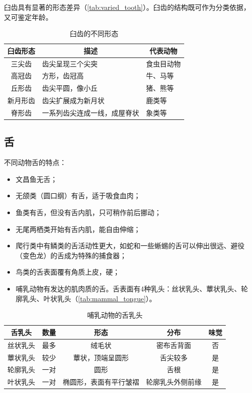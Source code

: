 臼齿具有显著的形态差异（\autoref{tab:varied_tooth}）。臼齿的结构既可作为分类依据，又可鉴定年龄。

\begin{table}[h]
	\centering
	\begin{tabularx}{\textwidth}{|c|X|X|}
		\hline
		臼齿形态 & \multicolumn{1}{c|}{描述} & \multicolumn{1}{c|}{代表动物} \\ \hline
		三尖齿 & 齿尖呈现三个尖突 & 食虫目动物 \\ \hline
		高冠齿 & 方形，齿冠高 & 牛、马等 \\ \hline
		丘形齿 & 齿尖平圆，像小丘 & 猪、熊等 \\ \hline
		新月形齿 & 齿尖扩展成为新月状 & 鹿类等 \\ \hline
		脊形齿 & 一系列齿尖连成一线，成屋脊状 & 象类等 \\ \hline
	\end{tabularx}
	\caption{臼齿的不同形态}
	\label{tab:varied_tooth}
\end{table}


\subsection{舌}

不同动物舌的特点：

\begin{itemize}
	\item 文昌鱼无舌；
	\item 无颌类（圆口纲）有舌，适于吸食血肉；
	\item 鱼类有舌，但没有舌内肌，只可稍作前后挪动；
	\item 无尾两栖类开始有舌内肌，能自由伸缩；
	\item 爬行类中有鳞类的舌活动性更大，如蛇和一些蜥蜴的舌可以伸出很远、避役（变色龙）的舌成为特殊的捕食器；
	\item 鸟类的舌表面覆有角质上皮，硬；
	\item 哺乳动物有发达的肌肉质的舌。舌表面有4种乳头：丝状乳头、蕈状乳头、轮廓乳头、叶状乳头（\autoref{tab:mammal_tongue}）。
\end{itemize}



\begin{table}[htbp]
	\centering
	\begin{tabularx}{\textwidth}{|c|c|C|C|c|}
		\hline
		\textbf{舌乳头} & \textbf{数量} & \textbf{形态} & \textbf{分布} & \textbf{味觉} \\ \hline
		丝状乳头 & 最多 & 绒毛状 & 密布舌背面 & 否 \\ \hline
		蕈状乳头 & 较少 & 蕈状，顶端呈圆形 & 舌尖较多 & 是 \\ \hline
		轮廓乳头 & 一对 & 圆形 & 舌根 & 是 \\ \hline
		叶状乳头 & 一对 & 椭圆形，表面有平行皱褶 & 轮廓乳头外侧前缘 & 是 \\ \hline
	\end{tabularx}
	\caption{哺乳动物的舌乳头}
	\label{tab:mammal_tongue}
\end{table}

